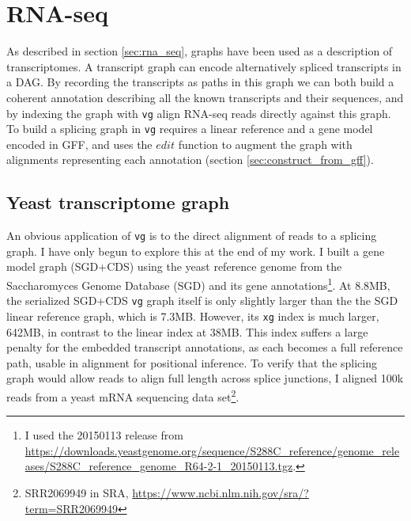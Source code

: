 \section{RNA-seq}

As described in section \ref{sec:rna_seq}, graphs have been used as a description of transcriptomes.
A transcript graph can encode alternatively spliced transcripts in a DAG.
By recording the transcripts as paths in this graph we can both build a coherent annotation describing all the known transcripts and their sequences, and by indexing the graph with {\tt vg} align RNA-seq reads directly against this graph.
To build a splicing graph in {\tt vg} requires a linear reference and a gene model encoded in GFF, and uses the $edit$ function to augment the graph with alignments representing each annotation (section \ref{sec:construct_from_gff}).

\subsection{Yeast transcriptome graph}

An obvious application of {\tt vg} is to the direct alignment of reads to a splicing graph.
I have only begun to explore this at the end of my work.
I built a gene model graph (SGD+CDS) using the yeast reference genome from the Saccharomyces Genome Database (SGD) and its gene annotations\footnote{I used the 20150113 release from \url{https://downloads.yeastgenome.org/sequence/S288C_reference/genome_releases/S288C_reference_genome_R64-2-1_20150113.tgz}.}.
At 8.8MB, the serialized SGD+CDS {\tt vg} graph itself is only slightly larger than the the SGD linear reference graph, which is 7.3MB.
However, its {\tt xg} index is much larger, 642MB, in contrast to the linear index at 38MB.
This index suffers a large penalty for the embedded transcript annotations, as each becomes a full reference path, usable in alignment for positional inference.
To verify that the splicing graph would allow reads to align full length across splice junctions, I aligned 100k reads from a yeast mRNA sequencing data set\footnote{SRR2069949 in SRA, \url{https://www.ncbi.nlm.nih.gov/sra/?term=SRR2069949}}.

